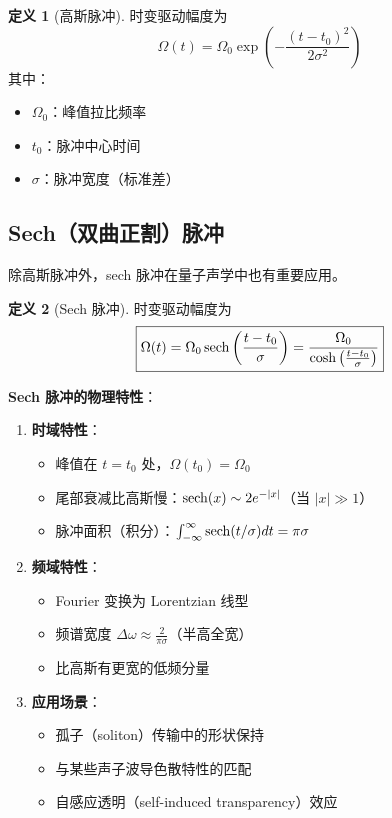 \documentclass[12pt,a4paper]{article}
\theoremstyle{definition}
\newtheorem{definition}{定义}[section]
\begin{document}
\begin{definition}[高斯脉冲]
时变驱动幅度为
\begin{equation}
    \boxed{\Omega(t) = \Omega_0 \exp\left(-\frac{(t-t_0)^2}{2\sigma^2}\right)}
    \label{eq:gaussian_pulse}
\end{equation}
其中：
\begin{itemize}
    \item $\Omega_0$：峰值拉比频率
    \item $t_0$：脉冲中心时间
    \item $\sigma$：脉冲宽度（标准差）
\end{itemize}
\end{definition}

\subsection{Sech（双曲正割）脉冲}

除高斯脉冲外，sech 脉冲在量子声学中也有重要应用。

\begin{definition}[Sech 脉冲]
时变驱动幅度为
\begin{equation}
    \boxed{\Omega(t) = \Omega_0 \sech\left(\frac{t-t_0}{\sigma}\right) = \frac{\Omega_0}{\cosh\left(\frac{t-t_0}{\sigma}\right)}}
    \label{eq:sech_pulse}
\end{equation}
\end{definition}

\textbf{Sech 脉冲的物理特性}：

\begin{enumerate}
    \item \textbf{时域特性}：
    \begin{itemize}
        \item 峰值在 $t = t_0$ 处，$\Omega(t_0) = \Omega_0$
        \item 尾部衰减比高斯慢：$\sech(x) \sim 2e^{-|x|}$（当 $|x| \gg 1$）
        \item 脉冲面积（积分）：$\int_{-\infty}^{\infty} \sech(t/\sigma) dt = \pi\sigma$
    \end{itemize}
    
    \item \textbf{频域特性}：
    \begin{itemize}
        \item Fourier 变换为 Lorentzian 线型
        \item 频谱宽度 $\Delta\omega \approx \frac{2}{\pi\sigma}$（半高全宽）
        \item 比高斯有更宽的低频分量
    \end{itemize}
    
    \item \textbf{应用场景}：
    \begin{itemize}
        \item 孤子（soliton）传输中的形状保持
        \item 与某些声子波导色散特性的匹配
        \item 自感应透明（self-induced transparency）效应
    \end{itemize}
\end{enumerate}
\end{document}
